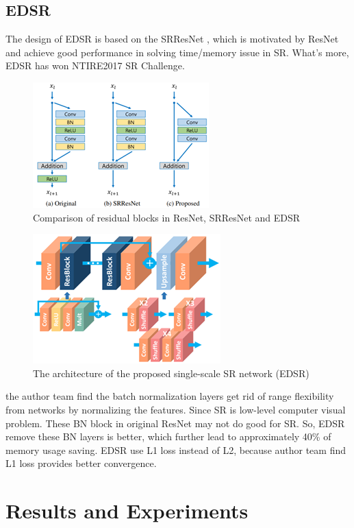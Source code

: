 \documentclass{article}
\begin{document}
  \subsection{EDSR}
  The design of EDSR is based on the SRResNet \cite{8}, which is motivated by ResNet \cite{7} and achieve good performance in solving time/memory issue in SR. 
  What's more, EDSR has won NTIRE2017 SR Challenge.
  \begin{figure}[H]
      \centering
      \includegraphics[scale = 0.6]{images/EDSR1.png}
      \caption{Comparison of residual blocks in ResNet, SRResNet and EDSR}
  \end{figure} 
  \begin{figure}[H]
      \centering
      \includegraphics[scale = 0.6]{images/EDSR2.png}
      \caption{The architecture of the proposed single-scale SR network (EDSR)}
  \end{figure} 
  the author team find the batch normalization layers get rid of range flexibility from networks by normalizing the features. 
  Since SR is low-level computer visual problem. These BN block in original ResNet may not do good for SR. 
  So, EDSR remove these BN layers is better, which further lead to approximately 40\% of memory usage saving. \cite{4}
  EDSR use L1 loss instead of L2, because author team find L1 loss provides better convergence.
  
  
  
  \section{Results and Experiments}
\end{document}
